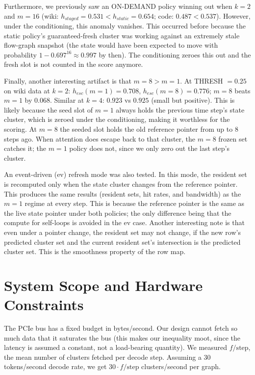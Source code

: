 \documentclass[11pt,a4paper]{article}
\begin{document}
Furthermore, we previously saw an ON-DEMAND policy winning out when $k=2$ and $m=16$ (wiki: $h_{staged} = 0.531 < h_{static} = 0.654$; code: $0.487 < 0.537$). However, under the conditioning, this anomaly vanishes. This occurred before because the static policy's guaranteed-fresh cluster was working against an extremely stale flow-graph snapshot (the state would have been expected to move with probability $1 - 0.697^{16} \approx 0.997$ by then). The conditioning zeroes this out and the fresh slot is not counted in the score anymore.

Finally, another interesting artifact is that $m=8 > m=1$. At THRESH $=0.25$ on wiki data at $k=2$: $h_{esc}(m{=}1) = 0.708$, $h_{esc}(m{=}8) = 0.776$; $m=8$ beats $m=1$ by $0.068$. Similar at $k=4$: $0.923$ vs $0.925$ (small but positive). This is likely because the seed slot of $m=1$ always holds the previous time step's state cluster, which is zeroed under the conditioning, making it worthless for the scoring. At $m=8$ the seeded slot holds the old reference pointer from up to 8 steps ago. When attention does escape back to that cluster, the $m=8$ frozen set catches it; the $m=1$ policy does not, since we only zero out the last step's cluster.

An event-driven (ev) refresh mode was also tested. In this mode, the resident set is recomputed only when the state cluster changes from the reference pointer. This produces the same results (resident sets, hit rates, and bandwidth) as the $m=1$ regime at every step. This is because the reference pointer is the same as the live state pointer under both policies; the only difference being that the compute for self-loops is avoided in the ev case. Another interesting note is that even under a pointer change, the resident set may not change, if the new row's predicted cluster set and the current resident set's intersection is the predicted cluster set. This is the smoothness property of the row map.


\section{System Scope and Hardware Constraints}\label{sec:bandwidth}

The PCIe bus has a fixed budget in bytes/second. Our design cannot fetch so much data that it saturates the bus (this makes our inequality moot, since the latency is assumed a constant, not a load-bearing quantity). We measured $f/\text{step}$, the mean number of clusters fetched per decode step. Assuming a 30 tokens/second decode rate, we get $30 \cdot f/\text{step}$ clusters/second per graph.
\end{document}
